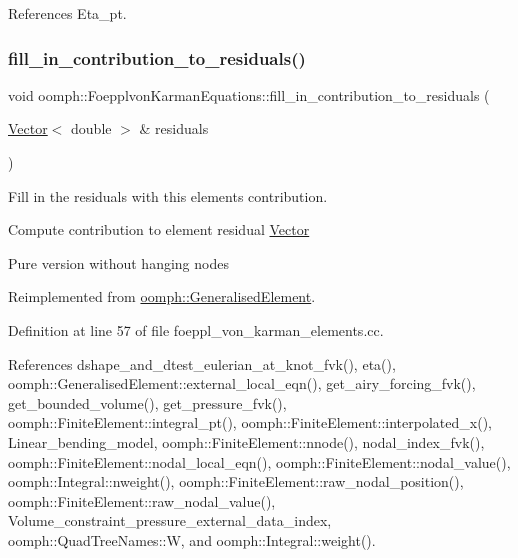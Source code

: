 References Eta\+\_\+pt.

\mbox{\label{classoomph_1_1FoepplvonKarmanEquations_a476cc624a69a47a4e66e1de129ad3a93}} 
\subsubsection{\texorpdfstring{fill\+\_\+in\+\_\+contribution\+\_\+to\+\_\+residuals()}{fill\_in\_contribution\_to\_residuals()}}
{\footnotesize\ttfamily void oomph\+::\+Foepplvon\+Karman\+Equations\+::fill\+\_\+in\+\_\+contribution\+\_\+to\+\_\+residuals (\begin{DoxyParamCaption}\item[{\hyperlink{classoomph_1_1Vector}{Vector}$<$ double $>$ \&}]{residuals }\end{DoxyParamCaption})\hspace{0.3cm}{\ttfamily [virtual]}}



Fill in the residuals with this element\textquotesingle{}s contribution. 

Compute contribution to element residual \hyperlink{classoomph_1_1Vector}{Vector}

Pure version without hanging nodes 

Reimplemented from \hyperlink{classoomph_1_1GeneralisedElement_a310c97f515e8504a48179c0e72c550d7}{oomph\+::\+Generalised\+Element}.



Definition at line 57 of file foeppl\+\_\+von\+\_\+karman\+\_\+elements.\+cc.



References dshape\+\_\+and\+\_\+dtest\+\_\+eulerian\+\_\+at\+\_\+knot\+\_\+fvk(), eta(), oomph\+::\+Generalised\+Element\+::external\+\_\+local\+\_\+eqn(), get\+\_\+airy\+\_\+forcing\+\_\+fvk(), get\+\_\+bounded\+\_\+volume(), get\+\_\+pressure\+\_\+fvk(), oomph\+::\+Finite\+Element\+::integral\+\_\+pt(), oomph\+::\+Finite\+Element\+::interpolated\+\_\+x(), Linear\+\_\+bending\+\_\+model, oomph\+::\+Finite\+Element\+::nnode(), nodal\+\_\+index\+\_\+fvk(), oomph\+::\+Finite\+Element\+::nodal\+\_\+local\+\_\+eqn(), oomph\+::\+Finite\+Element\+::nodal\+\_\+value(), oomph\+::\+Integral\+::nweight(), oomph\+::\+Finite\+Element\+::raw\+\_\+nodal\+\_\+position(), oomph\+::\+Finite\+Element\+::raw\+\_\+nodal\+\_\+value(), Volume\+\_\+constraint\+\_\+pressure\+\_\+external\+\_\+data\+\_\+index, oomph\+::\+Quad\+Tree\+Names\+::W, and oomph\+::\+Integral\+::weight().



